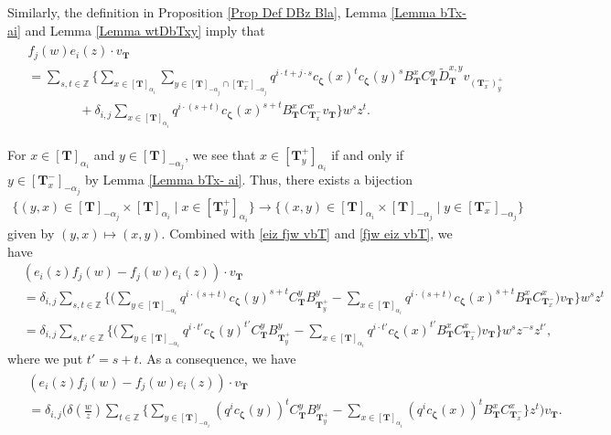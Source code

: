\documentclass[12pt]{amsart}
\numberwithin{equation}{thm}
\newcommand\ZZ{\mathbb Z}
\newcommand\bT{\mathbf T}
\renewcommand\a{\alpha}  %
\renewcommand\d{\delta}  %
\newcommand\Bz{\boldsymbol\zeta}
\newcommand\wt{\widetilde}
\newcommand\ra{\rightarrow}
\newcounter{ni}
\begin{document}
Similarly, the definition in Proposition \ref{Prop Def DBz Bla}, Lemma \ref{Lemma bTx- ai} and Lemma \ref{Lemma wtDbTxy} 
imply that 
\begin{align}
\label{fjw eiz vbT} 
\begin{split}
&f_j(w) e_i(z) \cdot v_{\bT} 
\\
&= \sum_{s,t \in \ZZ} \Big\{ 
	\sum_{x \in [\bT]_{\a_i}} \sum_{y \in [\bT]_{-\a_j} \cap [\bT_x^-]_{-\a_j} } 
		q^{i \cdot t + j \cdot s} c_{\Bz} (x)^t c_{\Bz} (y)^s B_{\bT}^x C_{\bT}^y \wt{D}_{\bT}^{x,y} v_{(\bT_x^-)_y^+} 
	\\ & \hspace{4em} 
	+ \d_{i,j} \sum_{x \in [\bT]_{\a_i}} q^{i \cdot (s+t)} c_{\Bz} (x)^{s+t} B_{\bT}^x C_{\bT_x^-}^x v_{\bT} 
	\Big\} w^s z^t. 
\end{split}
\end{align} 

For  $x \in [\bT]_{\a_i}$ and $y \in [\bT]_{-\a_j}$, 
we see that 
$x \in [\bT_y^+]_{\a_i}$ if and only if $ y \in [\bT_x^-]_{-\a_j}$ 
by  Lemma \ref{Lemma bTx- ai}.  
Thus, there exists a bijection 
\begin{align*}
\{(y,x) \in [\bT]_{-\a_j} \times [\bT]_{\a_i} \mid x \in [\bT_y^+]_{\a_i}\} 
\ra 
\{(x,y) \in [\bT]_{\a_i} \times [\bT]_{-\a_j} \mid y \in  [\bT_x^-]_{-\a_j} \} 
\end{align*}
given by $(y,x) \mapsto (x,y)$. 
Combined with \eqref{eiz fjw vbT} and \eqref{fjw eiz vbT}, we have 
\begin{align*}
&(e_i(z) f_j(w) - f_j(w) e_i(z) ) \cdot v_{\bT} 
\\
&= \d_{i,j} \sum_{s,t \in \ZZ} \Big\{
	\Big( \sum_{y \in [\bT]_{-\a_i}} q^{i \cdot (s+t)} c_{\Bz} (y)^{s+t} C_{\bT}^y B_{\bT_y^+}^y  
			- \sum_{x \in [\bT]_{\a_i}} q^{i \cdot (s+t)} c_{\Bz} (x)^{s+t} B_{\bT}^x C_{\bT_x^-}^x \Big) v_{\bT} 
	\Big\} w^s z^t 
\\
&= \d_{i,j} \sum_{s,t' \in \ZZ} \Big\{
	\Big( \sum_{y \in [\bT]_{-\a_i}} q^{i \cdot t' } c_{\Bz} (y)^{t'} C_{\bT}^y B_{\bT_y^+}^y  
			- \sum_{x \in [\bT]_{\a_i}} q^{i \cdot t'} c_{\Bz} (x)^{t'} B_{\bT}^x C_{\bT_x^-}^x \Big) v_{\bT} 
	\Big\} w^s z^{-s} z^{t'}, 
\end{align*}
where we put $t'=s+t$. 
As a consequence, we have 
\begin{align}
\label{eiz fjw - fjw eiz vbT}
\begin{split}
&(e_i(z) f_j(w) - f_j(w) e_i(z) ) \cdot v_{\bT} 
\\
&= \d_{i,j} \Big( \d \left( \frac{w}{z} \right) 
	\sum_{t \in \ZZ} \Big\{ \sum_{y \in [\bT]_{-\a_i}} (q^i c_{\Bz}(y))^t C_{\bT}^y B_{\bT_y^+}^y 
						- \sum_{x \in [\bT]_{\a_i}} (q^i c_{\Bz} (x))^t B_{\bT}^x C_{\bT_x^-}^x \Big\} z^t 
	\Big) v_{\bT}. 
\end{split}
\end{align}
\end{document}
